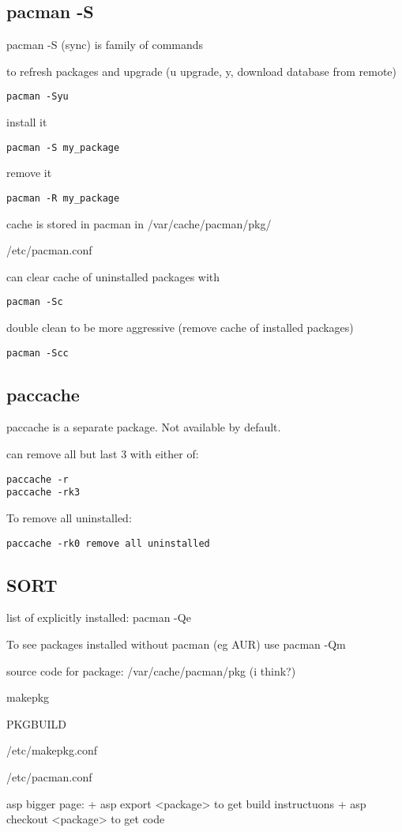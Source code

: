 
\subsection{pacman -S}


pacman -S (sync) is family of commands



to refresh packages and upgrade (u upgrade, y, download database from remote)

\begin{verbatim}
pacman -Syu
\end{verbatim}


install it
\begin{verbatim}
pacman -S my_package
\end{verbatim}

remove it
\begin{verbatim}
pacman -R my_package
\end{verbatim}


cache is stored in pacman in /var/cache/pacman/pkg/

/etc/pacman.conf


can clear cache of uninstalled packages with
\begin{verbatim}
pacman -Sc
\end{verbatim}

double clean to be more aggressive (remove cache of installed packages)
\begin{verbatim}
pacman -Scc
\end{verbatim}

\subsection{paccache}

paccache is a separate package. Not available by default.

can remove all but last 3 with either of:

\begin{verbatim}
paccache -r
paccache -rk3
\end{verbatim}

To remove all uninstalled:
\begin{verbatim}
paccache -rk0 remove all uninstalled
\end{verbatim}

\subsection{SORT}

list of explicitly installed: pacman -Qe

To see packages installed without pacman (eg AUR) use
pacman -Qm

source code for package: /var/cache/pacman/pkg (i think?)

makepkg

PKGBUILD

/etc/makepkg.conf

/etc/pacman.conf


asp bigger page:
+ asp export <package> to get build instructuons
+ asp checkout <package> to get code

